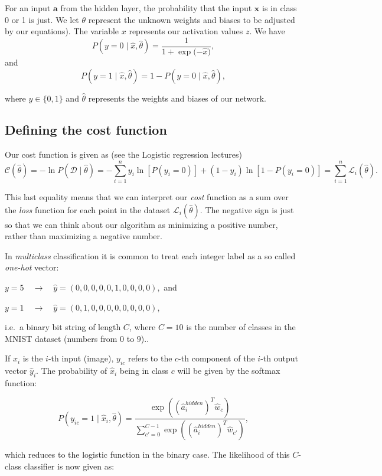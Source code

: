 \documentclass[%
oneside,                 %
final,                   %
10pt]{article}
\begin{document}
For an input $\boldsymbol{a}$ from the hidden layer, the probability that the input $\boldsymbol{x}$
is in class 0 or 1 is just. We let $\theta$ represent the unknown weights and biases to be adjusted by our equations). The variable $x$
represents our activation values $z$. We have
\[
P(y = 0 \mid \hat{x}, \hat{\theta}) = \frac{1}{1 + \exp{(- \hat{x}})} ,
\]
and
\[
P(y = 1 \mid \hat{x}, \hat{\theta}) = 1 - P(y = 0 \mid \hat{x}, \hat{\theta}) ,
\]

where $y \in \{0, 1\}$  and $\hat{\theta}$ represents the weights and biases
of our network.


\subsection{Defining the cost function}

Our cost function is given as (see the Logistic regression lectures)
\[
\mathcal{C}(\hat{\theta}) = - \ln P(\mathcal{D} \mid \hat{\theta}) = - \sum_{i=1}^n
y_i \ln[P(y_i = 0)] + (1 - y_i) \ln [1 - P(y_i = 0)] = \sum_{i=1}^n \mathcal{L}_i(\hat{\theta}) .
\]

This last equality means that we can interpret our \emph{cost} function as a sum over the \emph{loss} function
for each point in the dataset $\mathcal{L}_i(\hat{\theta})$.  
The negative sign is just so that we can think about our algorithm as minimizing a positive number, rather
than maximizing a negative number.  

In \emph{multiclass} classification it is common to treat each integer label as a so called \emph{one-hot} vector:  

$y = 5 \quad \rightarrow \quad \hat{y} = (0, 0, 0, 0, 0, 1, 0, 0, 0, 0) ,$ and


$y = 1 \quad \rightarrow \quad \hat{y} = (0, 1, 0, 0, 0, 0, 0, 0, 0, 0) ,$ 


i.e.~a binary bit string of length $C$, where $C = 10$ is the number of classes in the MNIST dataset (numbers from $0$ to $9$)..  

If $\hat{x}_i$ is the $i$-th input (image), $y_{ic}$ refers to the $c$-th component of the $i$-th
output vector $\hat{y}_i$.  
The probability of $\hat{x}_i$ being in class $c$ will be given by the softmax function:  

\[
P(y_{ic} = 1 \mid \hat{x}_i, \hat{\theta}) = \frac{\exp{((\hat{a}_i^{hidden})^T \hat{w}_c)}}
{\sum_{c'=0}^{C-1} \exp{((\hat{a}_i^{hidden})^T \hat{w}_{c'})}} ,
\]

which reduces to the logistic function in the binary case.  
The likelihood of this $C$-class classifier
is now given as:  
\end{document}
